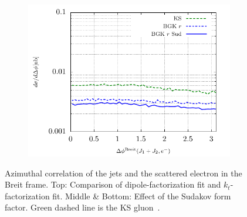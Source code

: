 \documentclass[a4,12pt]{article}
\begin{document}
\begin{figure}[p]
\begin{subfigure}{0.5\textwidth}
	\end{subfigure}
	\begin{subfigure}{0.5\textwidth}
	\includegraphics[width=\textwidth]{gnuplot/plotBGK3}
	\end{subfigure}
	\caption{\footnotesize Azimuthal correlation of the jets and the scattered electron in the Breit frame. Top: Comparison of dipole-factorization fit and $k_t$-factorization fit. Middle \& Bottom: Effect of the Sudakov form factor.   Green dashed line is the KS gluon~\cite{vanHameren:2021sqc}.}
	\label{fig:je-breit}
\end{figure}
\end{document}
